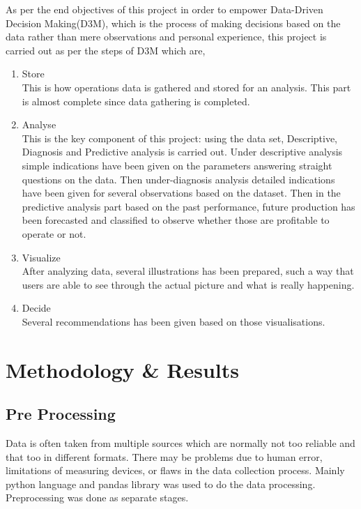 As per the end objectives of this project in order to empower Data-Driven Decision Making(D3M), which is the process of making decisions based on the data rather than mere observations and personal experience, this project is carried out as per the steps of D3M which are, \\

\begin{enumerate}
  \item Store \\
This is how operations data is gathered and stored for an analysis. This part is almost complete since data gathering is completed.
  \item Analyse \\
This is the key component of this project: using the data set, Descriptive, Diagnosis and Predictive analysis is carried out. Under descriptive analysis simple indications have been given on the parameters answering straight questions on the data. Then under-diagnosis analysis detailed indications have been given for several observations based on the dataset. Then in the predictive analysis part based on the past performance, future production has been forecasted and classified to observe whether those are profitable to operate or not.
  \item Visualize \\
After analyzing data, several illustrations has been prepared, such a way that users are able to see through the actual picture and what is really happening. 
  \item Decide \\
Several recommendations has been given based on those visualisations.

\end{enumerate}

\section{Methodology \& Results}
\subsection {Pre Processing}

Data is often taken from multiple sources which are normally not too reliable and that too in different formats. There may be problems due to human error, limitations of measuring devices, or flaws in the data collection process. Mainly python language \cite{python} and pandas library \cite{pandas} was used to do the data processing. Preprocessing was done as separate stages. \\


